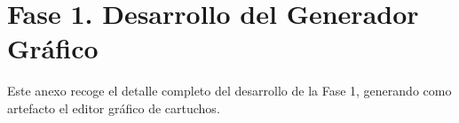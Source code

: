 \documentclass[../main.tex]{subfiles}
\begin{document}
\chapter{Fase 1. Desarrollo del Generador Gráfico}
\label{sec:DerarrolloFase1}

	Este anexo recoge el detalle completo del desarrollo de la Fase 1, generando como artefacto el editor gráfico de cartuchos.
	
	
	
	
	
	
	
	
	
	
	
	
	
	
	




\clearpage
\end{document}
